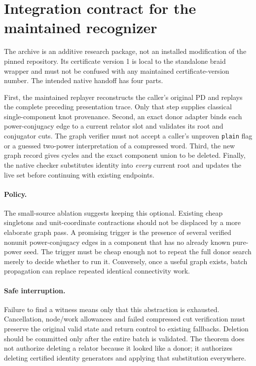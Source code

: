 \documentclass[11pt]{article}
\theoremstyle{definition}\newtheorem{definition}[theorem]{Definition}
\theoremstyle{remark}\newtheorem{remark}[theorem]{Remark}
\newcommand{\code}[1]{\texttt{#1}}
\begin{document}
\section{Integration contract for the maintained recognizer}
\label{sec:integration}
The archive is an additive research package, not an installed modification
of the pinned repository. Its certificate version 1 is local to the
standalone braid wrapper and must not be confused with any maintained
certificate-version number. The intended native handoff has four parts.

First, the maintained replayer reconstructs the caller's original PD and
replays the complete preceding presentation trace. Only that step supplies
classical single-component knot provenance. Second, an exact donor adapter
binds each power-conjugacy edge to a current relator slot and validates its
root and conjugator cuts. The graph verifier must not accept a caller's
unproven \code{plain} flag or a guessed two-power interpretation of a
compressed word. Third, the new graph record gives cycles and the exact
component union to be deleted. Finally, the native checker substitutes
identity into \emph{every} current root and updates the live set before
continuing with existing endpoints.

\paragraph{Policy.}
The small-source ablation suggests keeping this optional. Existing cheap
singletons and unit-coordinate contractions should not be displaced by a
more elaborate graph pass. A promising trigger is the presence of several
verified nonunit power-conjugacy edges in a component that has no already
known pure-power seed. The trigger must be cheap enough not to repeat the
full donor search merely to decide whether to run it. Conversely, once a
useful graph exists, batch propagation can replace repeated identical
connectivity work.

\paragraph{Safe interruption.}
Failure to find a witness means only that this abstraction is exhausted.
Cancellation, node/work allowances and failed compressed cut verification
must preserve the original valid state and return control to existing
fallbacks. Deletion should be committed only after the entire batch is
validated. The theorem does not authorize deleting a relator because it
looked like a donor; it authorizes deleting certified identity generators
and applying that substitution everywhere.
\end{document}

